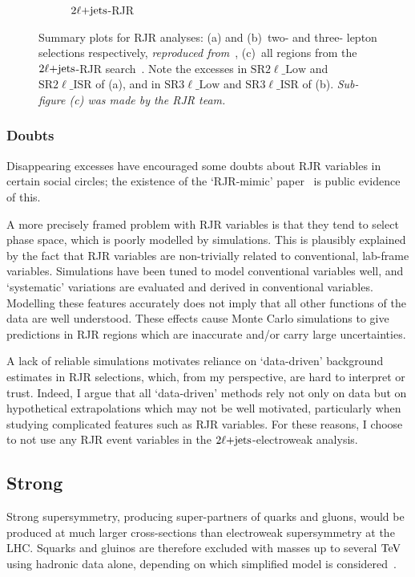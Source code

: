 \begin{figure}[tp]
\begin{subfigure}{0.8\textwidth}
\caption{$\twoljets$-RJR~\cite{atlas2022searches}}
\end{subfigure}
\caption[
Summary plots for RJR analyses
]{%
Summary plots for RJR analyses:
(a) and (b)~two- and three- lepton selections respectively,
\emph{reproduced from}~\cite{atlas_rjr_23l_SUSY_2017_03},
(c)~all regions from the $\twoljets$-RJR search~\cite{atlas2022searches}.
Note the excesses in
$\mathrm{SR}2\ell\_\mathrm{Low}$ and $\mathrm{SR}2\ell\_\mathrm{ISR}$ of (a),
and in
$\mathrm{SR}3\ell\_\mathrm{Low}$ and $\mathrm{SR}3\ell\_\mathrm{ISR}$ of (b).
\emph{Sub-figure (c) was made by the RJR team.}
}
\label{fig:2ljets_rjr_summaries}
\end{figure}


\subsubsection{Doubts}
Disappearing excesses have encouraged some doubts about RJR variables in
certain social circles;
the existence of the `RJR-mimic' paper~\cite{atlas_rjr_mimic_SUSY_2018_06}
is public evidence of this.

A more precisely framed problem with RJR variables is that they tend to select
phase space, which is poorly modelled by simulations.
This is plausibly explained by the fact that RJR variables are non-trivially
related to conventional, lab-frame variables.
Simulations have been tuned to model conventional variables well, and
`systematic' variations are evaluated and derived in conventional variables.
Modelling these features accurately does not imply that all other functions of
the data are well understood.
These effects cause Monte Carlo simulations to give predictions in RJR regions
which are inaccurate and/or carry large uncertainties.

A lack of reliable simulations motivates reliance on `data-driven' background
estimates in RJR selections, which, from my perspective, are hard to interpret
or trust.
Indeed, I argue that all `data-driven' methods rely not only on data but on
hypothetical extrapolations which may not be well motivated, particularly when
studying complicated features such as RJR variables.
For these reasons, I choose to not use any RJR event variables in the
$\twoljets$-electroweak analysis.


\FloatBarrier
\subsection{Strong}
\label{sec:2ljets_origins_strong}
Strong supersymmetry, producing super-partners of quarks and gluons, would be
produced at much larger cross-sections than electroweak supersymmetry at the
LHC.
Squarks and gluinos are therefore excluded with masses up to several
$\eV[T]$ using hadronic data alone, depending on which simplified model is
considered~\cite{atlas_susy_strong_0l}.

